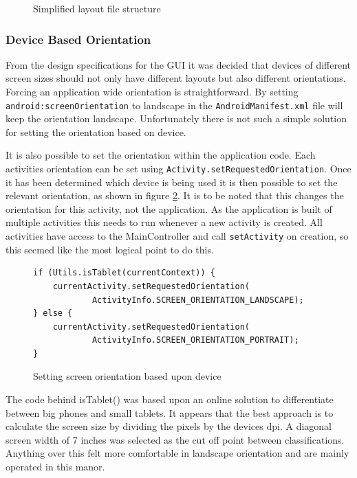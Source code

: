 \begin{figure}[H]
\caption{Simplified layout file structure}
\label{fig:fs}
\end{figure}

\subsubsection*{Device Based Orientation}
From the design specifications for the GUI it was decided that devices of different screen sizes should not only have different layouts but also different orientations. Forcing an application wide orientation is straightforward. By setting \verb|android:screenOrientation| to landscape in the \verb|AndroidManifest.xml| file will keep the orientation landscape. Unfortunately there is not such a simple solution for setting the orientation based on device.

It is also possible to set the orientation within the application code. Each activities orientation can be set using \verb|Activity.setRequestedOrientation|. Once it has been determined which device is being used it is then possible to set the relevant orientation, as shown in figure \ref{fig:orientation}. It is to be noted that this changes the orientation for this activity, not the application. As the application is built of multiple activities this needs to run whenever a new activity is created. All activities have access to the MainController and call \verb|setActivity| on creation, so this seemed like the most logical point to do this.

\begin{figure}[H]
\begin{lstlisting}
if (Utils.isTablet(currentContext)) {
    currentActivity.setRequestedOrientation(
            ActivityInfo.SCREEN_ORIENTATION_LANDSCAPE);
} else {
    currentActivity.setRequestedOrientation(
            ActivityInfo.SCREEN_ORIENTATION_PORTRAIT);
}
\end{lstlisting}
\caption{Setting screen orientation based upon device}
\label{fig:orientation}
\end{figure}

The code behind isTablet() was based upon an online solution\cite{istablet} to differentiate between big phones and small tablets. It appears that the best approach is to calculate the screen size by dividing the pixels by the devices dpi. A diagonal screen width of 7 inches was selected as the cut off point between classifications. Anything over this felt more comfortable in landscape orientation and are mainly operated in this manor.

